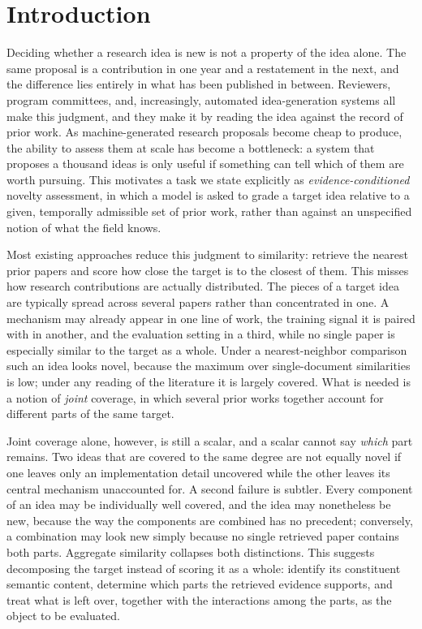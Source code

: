 \section{Introduction}
\label{sec:intro}

Deciding whether a research idea is new is not a property of the idea alone. The
same proposal is a contribution in one year and a restatement in the next, and
the difference lies entirely in what has been published in between. Reviewers,
program committees, and, increasingly, automated idea-generation systems all
make this judgment, and they make it by reading the idea against the record of
prior work. As machine-generated research proposals become cheap to produce,
the ability to assess them at scale has become a bottleneck: a system that
proposes a thousand ideas is only useful if something can tell which of them
are worth pursuing. This motivates a task we state explicitly as
\emph{evidence-conditioned} novelty assessment, in which a model is asked to
grade a target idea relative to a given, temporally admissible set of prior
work, rather than against an unspecified notion of what the field knows.

Most existing approaches reduce this judgment to similarity: retrieve the
nearest prior papers and score how close the target is to the closest of them.
This misses how research contributions are actually distributed. The pieces of
a target idea are typically spread across several papers rather than
concentrated in one. A mechanism may already appear in one line of work, the
training signal it is paired with in another, and the evaluation setting in a
third, while no single paper is especially similar to the target as a whole.
Under a nearest-neighbor comparison such an idea looks novel, because the
maximum over single-document similarities is low; under any reading of the
literature it is largely covered. What is needed is a notion of \emph{joint}
coverage, in which several prior works together account for different parts of
the same target.

Joint coverage alone, however, is still a scalar, and a scalar cannot say
\emph{which} part remains. Two ideas that are covered to the same degree are
not equally novel if one leaves only an implementation detail uncovered while
the other leaves its central mechanism unaccounted for. A second failure is
subtler. Every component of an idea may be individually well covered, and the
idea may nonetheless be new, because the way the components are combined has no
precedent; conversely, a combination may look new simply because no single
retrieved paper contains both parts. Aggregate similarity collapses both
distinctions. This suggests decomposing the target instead of scoring it as a
whole: identify its constituent semantic content, determine which parts the
retrieved evidence supports, and treat what is left over, together with the
interactions among the parts, as the object to be evaluated.

